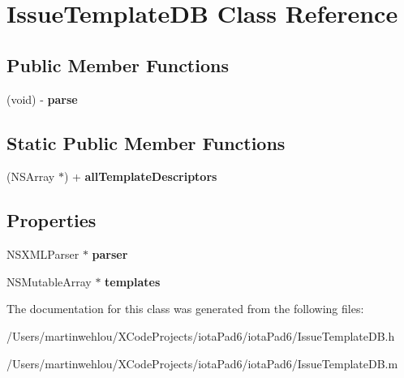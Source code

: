 \hypertarget{interface_issue_template_d_b}{
\section{IssueTemplateDB Class Reference}
\label{interface_issue_template_d_b}
}
\subsection*{Public Member Functions}
\begin{DoxyCompactItemize}
\item 
\hypertarget{interface_issue_template_d_b_a717626e2749591fde7c166a2f7ff6604}{
(void) -\/ {\bfseries parse}}
\label{interface_issue_template_d_b_a717626e2749591fde7c166a2f7ff6604}

\end{DoxyCompactItemize}
\subsection*{Static Public Member Functions}
\begin{DoxyCompactItemize}
\item 
\hypertarget{interface_issue_template_d_b_a40dafd65ce561437d165a83043fb5546}{
(NSArray $\ast$) + {\bfseries allTemplateDescriptors}}
\label{interface_issue_template_d_b_a40dafd65ce561437d165a83043fb5546}

\end{DoxyCompactItemize}
\subsection*{Properties}
\begin{DoxyCompactItemize}
\item 
\hypertarget{interface_issue_template_d_b_af5513dc1a31b4127b2b311a764d1d8c5}{
NSXMLParser $\ast$ {\bfseries parser}}
\label{interface_issue_template_d_b_af5513dc1a31b4127b2b311a764d1d8c5}

\item 
\hypertarget{interface_issue_template_d_b_aabf8b826a41e0ab1341e02908e294c8f}{
NSMutableArray $\ast$ {\bfseries templates}}
\label{interface_issue_template_d_b_aabf8b826a41e0ab1341e02908e294c8f}

\end{DoxyCompactItemize}


The documentation for this class was generated from the following files:\begin{DoxyCompactItemize}
\item 
/Users/martinwehlou/XCodeProjects/iotaPad6/iotaPad6/IssueTemplateDB.h\item 
/Users/martinwehlou/XCodeProjects/iotaPad6/iotaPad6/IssueTemplateDB.m\end{DoxyCompactItemize}
